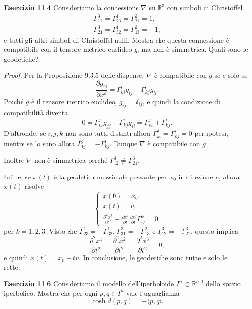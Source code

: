 \documentclass[a4paper]{article}
\newcommand{\R}{\mathbb{R}}
\theoremstyle{definition}
\theoremstyle{definition}
\theoremstyle{remark}
\theoremstyle{definition}
\begin{document}
\textbf{Esercizio 11.4}
Consideriamo la connessione $\nabla$ su $\R^3$ con simboli di Christoffel
\begin{align*}
	\Gamma^3_{12} = \Gamma^1_{23} = \Gamma^2_{31} = 1, \\
	\Gamma^3_{21} = \Gamma^1_{32} = \Gamma^2_{13} = -1,
\end{align*}
e tutti gli altri simboli di Christoffel nulli. Mostra che questa connessione è compatibile con il tensore metrico euclideo $g$, ma non è simmetrica. Quali sono le geodetiche?
\begin{proof}
	Per la Proposizione 9.3.5 delle dispense, $\nabla$ è compatibile con $g$ se e solo se
	\[
		\frac{\partial g_{ij}}{\partial x^k} = \Gamma^l_{ki} g_{lj} + \Gamma^l_{kj} g_{li}
		.\]
	Poiché $g$ è il tensore metrico euclideo, $g_{ij} = \delta_{ij}$, e quindi la condizione di compatibilità diventa
	\[
		0 = \Gamma^j_{ki}g_{jj} + \Gamma^i_{kj}g_{ii}=\Gamma^j_{ki}+\Gamma^i_{kj}
		.\]
	D'altronde, se $i,j,k$ non sono tutti distinti allora $\Gamma^j_{ki}=\Gamma^i_{kj}=0$ per ipotesi, mentre se lo sono allora
	$\Gamma^j_{ki}=-\Gamma^i_{kj}$. Dunque $\nabla$ è compatibile con $g$.

	Inoltre $\nabla$ non è simmetrica perché $\Gamma^3_{12} \neq \Gamma^3_{21}$.

	Infine, se $x(t)$ è la geodetica massimale passante per $x_0$ in direzione $v$, allora $x(t)$ risolve
	\[
		\begin{cases}
			x(0) = x_0,     \\
			\dot{x}(t) = v, \\
			\frac{\partial^2x^k}{\partial t^2} + \frac{\partial x^i}{\partial t}\frac{\partial x^j}{\partial t}\Gamma^k_{ij} = 0
		\end{cases}
	\]
	per $k=1,2,3$. Visto che $\Gamma^1_{23} = -\Gamma^1_{32}$, $\Gamma^2_{31} = -\Gamma^2_{13}$ e $\Gamma^3_{12} = -\Gamma^3_{21}$, questo implica \[\frac{\partial^2 x^1}{\partial t^2}
		= \frac{\partial^2 x^2}{\partial t^2} = \frac{\partial^2 x^3}{\partial t^2} = 0,\] e quindi $x(t)=x_0+t v$. In conclusione, le geodetiche sono tutte e solo le rette.
\end{proof}

\textbf{Esercizio 11.6}
Consideriamo il modello dell'iperboloide $I^n \subset \R^{n,1}$ dello spazio iperbolico. Mostra che per ogni $p, q \in I^n$ vale l'uguaglianza
\[
	\cosh d(p, q) = -\langle p, q \rangle
	.\]
\end{document}
